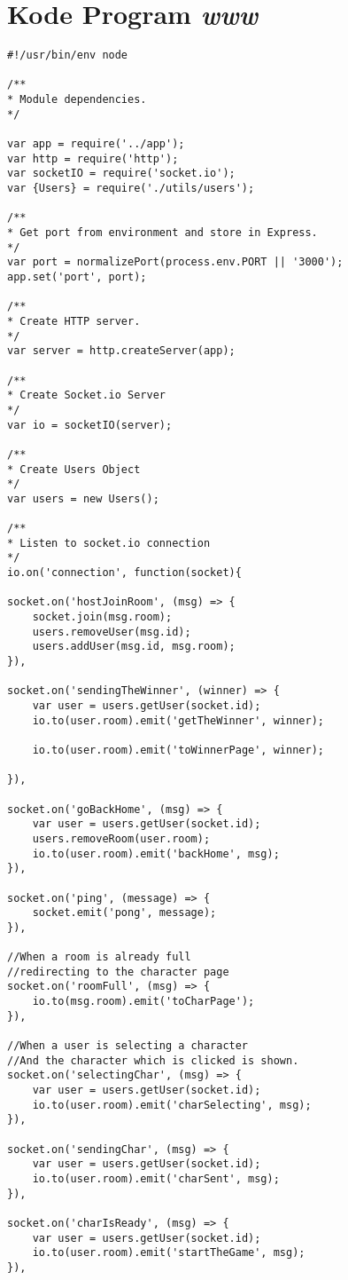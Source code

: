 \section{Kode Program \textit{www}}
\begin{lstlisting}
#!/usr/bin/env node

/**
* Module dependencies.
*/

var app = require('../app');
var http = require('http');
var socketIO = require('socket.io');
var {Users} = require('./utils/users');

/**
* Get port from environment and store in Express.
*/
var port = normalizePort(process.env.PORT || '3000');
app.set('port', port);

/**
* Create HTTP server.
*/
var server = http.createServer(app);

/**
* Create Socket.io Server
*/
var io = socketIO(server);

/**
* Create Users Object
*/
var users = new Users();

/**
* Listen to socket.io connection
*/
io.on('connection', function(socket){

socket.on('hostJoinRoom', (msg) => {
	socket.join(msg.room);
	users.removeUser(msg.id);
	users.addUser(msg.id, msg.room);
}),

socket.on('sendingTheWinner', (winner) => {
	var user = users.getUser(socket.id);
	io.to(user.room).emit('getTheWinner', winner);

	io.to(user.room).emit('toWinnerPage', winner);

}),

socket.on('goBackHome', (msg) => {
	var user = users.getUser(socket.id);
	users.removeRoom(user.room);
	io.to(user.room).emit('backHome', msg);
}),

socket.on('ping', (message) => {
	socket.emit('pong', message);
}),

//When a room is already full
//redirecting to the character page
socket.on('roomFull', (msg) => {
	io.to(msg.room).emit('toCharPage');
}),

//When a user is selecting a character
//And the character which is clicked is shown.
socket.on('selectingChar', (msg) => {
	var user = users.getUser(socket.id);
	io.to(user.room).emit('charSelecting', msg);
}),

socket.on('sendingChar', (msg) => {
	var user = users.getUser(socket.id);
	io.to(user.room).emit('charSent', msg);
}),

socket.on('charIsReady', (msg) => {
	var user = users.getUser(socket.id);
	io.to(user.room).emit('startTheGame', msg);
}),


\end{lstlisting}
